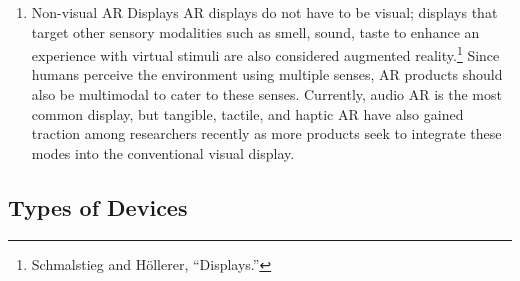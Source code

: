\begin{enumerate}
\begin{figure}[!ht]
\vspace{-.1 in}
\end{figure}

\item Non-visual AR Displays\newline
AR displays do not have to be visual; displays that target other sensory modalities such as smell, sound, taste to enhance an experience with virtual stimuli are also considered augmented reality.\footnote{Schmalstieg and Höllerer, “Displays.”} Since humans perceive the environment using multiple senses, AR products should also be multimodal to cater to these senses. Currently, audio AR is the most common display, but tangible, tactile, and haptic AR have also gained traction among researchers recently as more products seek to integrate these modes into the conventional visual display.
\end{enumerate}
\clearpage

\subsection{Types of Devices}

\begin{figure}[!ht]
\vspace{-.1 in}
\end{figure}

